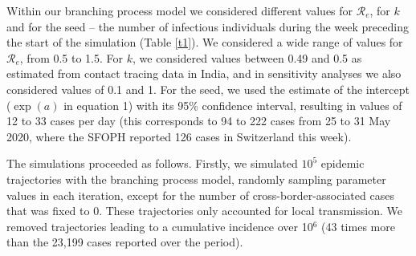 \documentclass[10pt, a4paper, twoside]{article}
\begin{document}
\begin{multicols}{2}
Within our branching process model we considered different values for $\mathcal{R}_e$, for $k$ and for the seed -- the number of infectious individuals during the week preceding the start of the simulation (Table \ref{t1}).
We considered a wide range of values for $\mathcal{R}_e$, from 0.5 to 1.5.
For $k$, we considered values between 0.49 and 0.5 as estimated from contact tracing data in India\cite{laxminarayan_epidemiology_2020}, and in sensitivity analyses we also considered values of 0.1 and 1.\cite{taube_open-access_2021}
For the seed, we used the estimate of the intercept ($\exp(a)$ in equation 1) with its 95\% confidence interval, resulting in values of 12 to 33 cases per day (this corresponds to 94 to 222 cases from 25 to 31 May 2020, where the SFOPH reported 126 cases in Switzerland this week).

The simulations proceeded as follows.
Firstly, we simulated $10^5$ epidemic trajectories with the branching process model, randomly sampling parameter values in each iteration, except for the number of cross-border-associated cases that was fixed to 0.
These trajectories only accounted for local transmission.
We removed trajectories leading to a cumulative incidence over 10$^6$ (43 times more than the 23,199 cases reported over the period).

\end{multicols}
\end{document}
